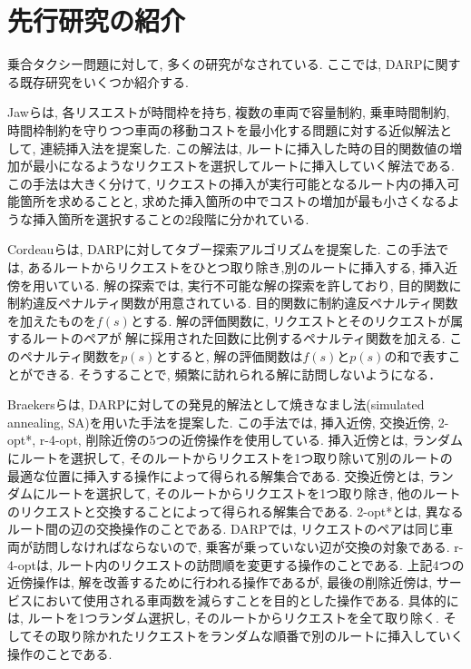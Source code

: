 \chapter{先行研究の紹介}\label{previous_research}
乗合タクシー問題に対して, 多くの研究がなされている. ここでは, DARPに関する既存研究をいくつか紹介する.

Jawらは, 各リスエストが時間枠を持ち, 複数の車両で容量制約, 乗車時間制約, 時間枠制約を守りつつ車両の移動コストを最小化する問題に対する近似解法として, 連続挿入法を提案した\cite{insertion}. この解法は, ルートに挿入した時の目的関数値の増加が最小になるようなリクエストを選択してルートに挿入していく解法である. この手法は大きく分けて, リクエストの挿入が実行可能となるルート内の挿入可能箇所を求めることと, 求めた挿入箇所の中でコストの増加が最も小さくなるような挿入箇所を選択することの2段階に分かれている.

Cordeauらは, DARPに対してタブー探索アルゴリズムを提案した\cite{tabu}. この手法では, あるルートからリクエストをひとつ取り除き,別のルートに挿入する, 挿入近傍を用いている. 解の探索では, 実行不可能な解の探索を許しており, 目的関数に制約違反ペナルティ関数が用意されている. 目的関数に制約違反ペナルティ関数を加えたものを$f(s)$とする. 解の評価関数に, リクエストとそのリクエストが属するルートのペアが解に採用された回数に比例するペナルティ関数を加える. このペナルティ関数を$p(s)$とすると, 解の評価関数は$f(s)とp(s)$の和で表すことができる. そうすることで, 頻繁に訪れられる解に訪問しないようになる．

Braekersらは, DARPに対しての発見的解法として焼きなまし法(simulated annealing, SA)を用いた手法を提案した\cite{SA}. この手法では, 挿入近傍, 交換近傍, 2-opt*, r-4-opt, 削除近傍の5つの近傍操作を使用している.
挿入近傍とは, ランダムにルートを選択して, そのルートからリクエストを1つ取り除いて別のルートの最適な位置に挿入する操作によって得られる解集合である.
交換近傍とは, ランダムにルートを選択して, そのルートからリクエストを1つ取り除き, 他のルートのリクエストと交換することによって得られる解集合である.
2-opt*とは, 異なるルート間の辺の交換操作のことである.  DARPでは, リクエストのペアは同じ車両が訪問しなければならないので, 乗客が乗っていない辺が交換の対象である.
r-4-optは, ルート内のリクエストの訪問順を変更する操作のことである.
上記4つの近傍操作は, 解を改善するために行われる操作であるが, 最後の削除近傍は, サービスにおいて使用される車両数を減らすことを目的とした操作である. 具体的には, ルートを1つランダム選択し, そのルートからリクエストを全て取り除く. そしてその取り除かれたリクエストをランダムな順番で別のルートに挿入していく操作のことである.

